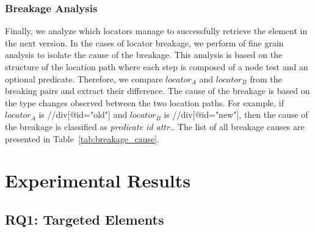 \subsubsection{Breakage Analysis}
\label{sec:hpath-protocol-breakage-analysis}

Finally, we analyze which locators manage to successfully retrieve the element in the next version. In the cases of locator breakage, we perform of fine grain analysis to isolate the cause of the breakage. This analysis is based on the structure of the location path where each step is composed of a node test and an optional predicate. Therefore, we compare $locator_A$ and $locator_B$ from the breaking pairs and extract their difference. The cause of the breakage is based on the type changes observed between the two location paths. For example, if $locator_A$ is //div[@id="old"] and $locator_B$ is //div[@id="new"], then the cause of the breakage is classified as \emph{predicate id attr.}. The list of all breakage causes are presented in Table~\ref{tab:breakage_cause}. 

\section{Experimental Results}

\subsection{RQ1: Targeted Elements}
\label{sec:hpath-results-rq1}

